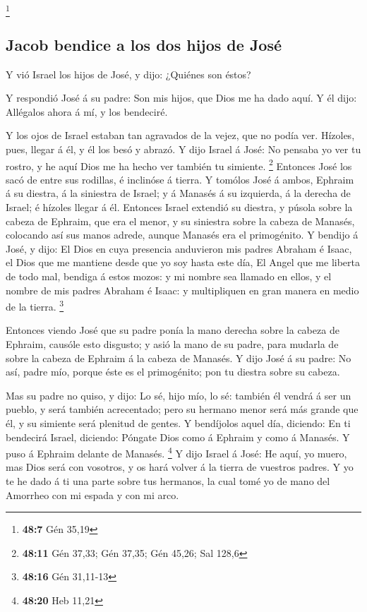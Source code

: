 \footnote{\textbf{48:7} Gén 35,19}

\hypertarget{jacob-bendice-a-los-dos-hijos-de-josuxe9}{%
\subsection{Jacob bendice a los dos hijos de
José}\label{jacob-bendice-a-los-dos-hijos-de-josuxe9}}

 Y vió Israel los hijos de José, y dijo: ¿Quiénes son
éstos?

 Y respondió José á su padre: Son mis hijos, que Dios me
ha dado aquí. Y él dijo: Allégalos ahora á mí, y los bendeciré.

 Y los ojos de Israel estaban tan agravados de la vejez,
que no podía ver. Hízoles, pues, llegar á él, y él los besó y abrazó.
 Y dijo Israel á José: No pensaba yo ver tu rostro, y he
aquí Dios me ha hecho ver también tu simiente. \footnote{\textbf{48:11}
  Gén 37,33; Gén 37,35; Gén 45,26; Sal 128,6}  Entonces
José los sacó de entre sus rodillas, é inclinóse á tierra.
 Y tomólos José á ambos, Ephraim á su diestra, á la
siniestra de Israel; y á Manasés á su izquierda, á la derecha de Israel;
é hízoles llegar á él.  Entonces Israel extendió su
diestra, y púsola sobre la cabeza de Ephraim, que era el menor, y su
siniestra sobre la cabeza de Manasés, colocando así sus manos adrede,
aunque Manasés era el primogénito.  Y bendijo á José, y
dijo: El Dios en cuya presencia anduvieron mis padres Abraham é Isaac,
el Dios que me mantiene desde que yo soy hasta este día, 
El Angel que me liberta de todo mal, bendiga á estos mozos: y mi nombre
sea llamado en ellos, y el nombre de mis padres Abraham é Isaac: y
multipliquen en gran manera en medio de la tierra. \footnote{\textbf{48:16}
  Gén 31,11-13}

 Entonces viendo José que su padre ponía la mano derecha
sobre la cabeza de Ephraim, causóle esto disgusto; y asió la mano de su
padre, para mudarla de sobre la cabeza de Ephraim á la cabeza de
Manasés.  Y dijo José á su padre: No así, padre mío,
porque éste es el primogénito; pon tu diestra sobre su cabeza.

 Mas su padre no quiso, y dijo: Lo sé, hijo mío, lo sé:
también él vendrá á ser un pueblo, y será también acrecentado; pero su
hermano menor será más grande que él, y su simiente será plenitud de
gentes.  Y bendíjolos aquel día, diciendo: En ti
bendecirá Israel, diciendo: Póngate Dios como á Ephraim y como á
Manasés. Y puso á Ephraim delante de Manasés. \footnote{\textbf{48:20}
  Heb 11,21}  Y dijo Israel á José: He aquí, yo muero,
mas Dios será con vosotros, y os hará volver á la tierra de vuestros
padres.  Y yo te he dado á ti una parte sobre tus
hermanos, la cual tomé yo de mano del Amorrheo con mi espada y con mi
arco.

